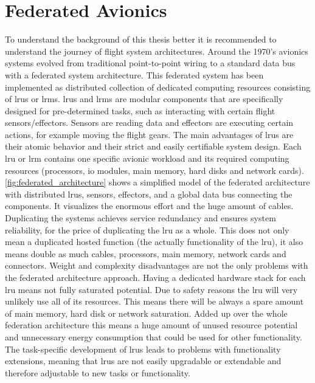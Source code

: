 \documentclass[titlepage]{report}
\begin{document}
\section{Federated Avionics}\label{section:federated_avionics}
To understand the background of this thesis better it is recommended to understand the journey of flight system architectures.
Around the 1970's avionics systems evolved from traditional point-to-point wiring to a standard data bus with a federated system
architecture\cite{xiong2009advanced}. This federated system
has been implemented as distributed collection of dedicated computing resources consisting of \glspl{lru} or \glspl{lrm}\cite{watkins2007transitioning}.
\glspl{lru} and \glspl{lrm} are modular components that are specifically designed for pre-determined tasks, such as
interacting with certain flight sensors/effectors\cite{lemke1985comparative}.
Sensors are reading data and effectors are executing certain actions, for example moving the flight gears.
The main advantages of \glspl{lru} are their atomic behavior and their strict and easily certifiable system design.
Each \gls{lru} or \gls{lrm} contains one specific avionic workload and its required computing resources (processors, 
\gls{io} modules, main memory, hard disks and network cards). \autoref{fig:federated_architecture} shows a simplified model
of the federated architecture with distributed \glspl{lru}, sensors, effectors, and a global data bus connecting the components.
It visualizes the enormous effort and the huge amount of cables. Duplicating the systems achieves service redundancy and ensures
system reliability\cite{prisaznuk1992integrated}, for the price of duplicating the \gls{lru} as a whole. This does not
only mean a duplicated hosted function (the actually functionality of the \gls{lru}), it also means double as much cables,
processors, main memory, network cards and connectors. Weight and complexity disadvantages are not the only problems with the federated
architecture approach. Having a dedicated hardware stack for each \gls{lru} means not fully saturated potential. Due to safety reasons
the \gls{lru} will very unlikely use all of its resources. This means there will be always a spare amount of main memory, hard disk
or network saturation. Added up over the whole federation architecture this means a huge amount of unused resource potential and unnecessary
energy consumption that could be used for other functionality. The task-specific development of \glspl{lru} leads to problems with 
functionality extensions, meaning that \glspl{lru} are not easily upgradable or extendable and therefore adjustable to new tasks or functionality.
\end{document}
